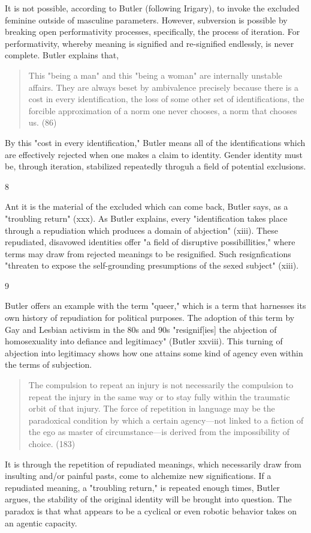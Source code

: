 \documentclass[11pt]{article}
\begin{document}
It is not possible, according to Butler (following Irigary), to invoke
the excluded feminine outside of masculine parameters. However,
subversion is possible by breaking open performativity processes,
specifically, the process of iteration. For performativity, whereby
meaning is signified and re-signified endlessly, is never complete.
Butler explains that,
\begin{quote}
This "being a man" and this "being a woman" are internally unstable
affairs. They are always beset by ambivalence precisely because there
is a cost in every identification, the loss of some other set of
identifications, the forcible approximation of a norm one never
chooses, a norm that chooses us. (86)
\end{quote}
By this "cost in every identification," Butler means all of the
identifications which are effectively rejected when one makes a claim
to identity. Gender identity must be, through iteration, stabilized
repeatedly throguh a field of potential exclusions.

8

Ant it is the material of the excluded which can come back, Butler
says, as a "troubling return" (xxx). As Butler explains, every
"identification takes place through a repudiation which produces a
domain of abjection" (xiii). These repudiated, disavowed identities
offer "a field of disruptive possibillities," where terms may draw
from rejected meanings to be resignified. Such resignfications
"threaten to expose the self-grounding presumptions of the sexed
subject" (xiii).

9

Butler offers an example with the term "queer," which is a term that
harnesses its own history of repudiation for political purposes. The
adoption of this term by Gay and Lesbian activism in the 80s and 90s
"resignif[ies] the abjection of homosexuality into defiance and
legitimacy" (Butler xxviii). This turning of abjection into legitimacy
shows how one attains some kind of agency even within the terms of
subjection.
\begin{quote}
The compulsion to repeat an injury is not necessarily the compulsion
to repeat the injury in the same way or to stay fully within the
traumatic orbit of that injury. The force of repetition in language
may be the paradoxical condition by which a certain agency---not
linked to a fiction of the ego as master of circumstance---is derived
from the impossibility of choice. (183)
\end{quote}
It is through the repetition of repudiated meanings, which necessarily
draw from insulting and/or painful pasts, come to alchemize new
significations. If a repudiated meaning, a "troubling return," is
repeated enough times, Butler argues, the stability of the original
identity will be brought into question. The paradox is that what
appears to be a cyclical or even robotic behavior takes on an agentic
capacity.
\end{document}

